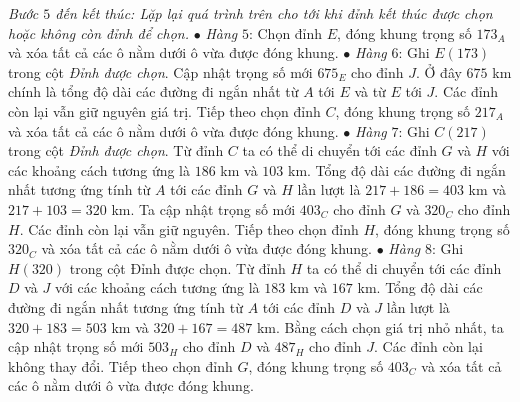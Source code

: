 \begin{multicols}{2}
\begin{table}[H]
		\vspace*{-10pt}
		\centering
		\captionsetup{labelformat= empty, justification=centering}
		\vspace*{-10pt}
	\end{table}
	\textit{Bước $5$ đến kết thúc: Lặp lại quá trình trên cho tới khi đỉnh kết thúc được chọn hoặc không còn đỉnh để chọn.}
	\vskip 0.05cm 
	$\bullet$ \textit{Hàng} $5$: Chọn đỉnh $E$, đóng khung trọng số $173_A$ và xóa tất cả các ô nằm dưới ô vừa được đóng khung. 
	\vskip 0.05cm
	$\bullet$ \textit{Hàng} $6$: Ghi $E(173)$ trong cột \textit{Đỉnh được chọn}. Cập nhật trọng số mới $675_E$ cho đỉnh $J$. Ở đây $675$ km chính là tổng độ dài các đường đi ngắn nhất từ $A$ tới $E$ và từ $E$ tới $J$. Các đỉnh còn lại vẫn giữ nguyên giá trị. Tiếp theo chọn đỉnh $C$, đóng khung trọng số $217_A$ và xóa tất cả các ô nằm dưới ô vừa được đóng khung.
	\vskip 0.05cm 
	$\bullet$ \textit{Hàng} $7$: Ghi $C(217)$ trong cột \textit{Đỉnh được chọn}. Từ đỉnh $C$ ta có thể di chuyển tới các đỉnh $G$ và $H$ với các khoảng cách tương ứng là $186$ km và $103$ km. Tổng độ dài các đường đi ngắn nhất tương ứng tính từ $A$ tới các đỉnh $G$ và $H$ lần lượt là $217+186=403$ km và $217+103=320$ km. Ta cập nhật trọng số mới $403_C$ cho đỉnh $G$ và $320_C$ cho đỉnh $H$. Các đỉnh còn lại vẫn giữ nguyên. Tiếp theo chọn đỉnh $H$, đóng khung trọng số $320_C$ và xóa tất cả các ô nằm dưới ô vừa được đóng khung.
	\vskip 0.05cm
	$\bullet$ \textit{Hàng} $8$: Ghi $H(320)$ trong cột Đỉnh được chọn. Từ đỉnh $H$ ta có thể di chuyển tới các đỉnh $D$ và $J$ với các khoảng cách tương ứng là $183$ km và $167$ km. Tổng độ dài các đường đi ngắn nhất tương ứng tính từ $A$ tới các đỉnh $D$ và $J$ lần lượt là $320+183=503$ km và $320+167=487$ km. Bằng cách chọn giá trị nhỏ nhất, ta cập nhật trọng số mới $503_H$ cho đỉnh $D$ và $487_H$ cho đỉnh $J$. Các đỉnh còn lại không thay đổi. Tiếp theo chọn đỉnh $G$, đóng khung trọng số $403_C$ và xóa tất cả các ô nằm dưới ô vừa được đóng khung.

\end{multicols}
